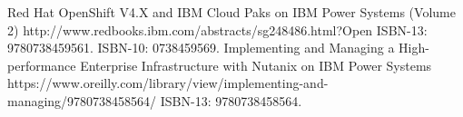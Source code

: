 %
%
%


\begin{publications}
    \publication
        {Red Hat OpenShift V4.X and IBM Cloud Paks on IBM Power Systems (Volume 2)}
        {http://www.redbooks.ibm.com/abstracts/sg248486.html?Open}
        ISBN-13: 9780738459561. ISBN-10: 0738459569.
        \newline
    \publication
        {Implementing and Managing a High-performance Enterprise Infrastructure with Nutanix on IBM Power Systems}
        {https://www.oreilly.com/library/view/implementing-and-managing/9780738458564/}
        ISBN-13: 9780738458564.
        \newline
\end{publications}